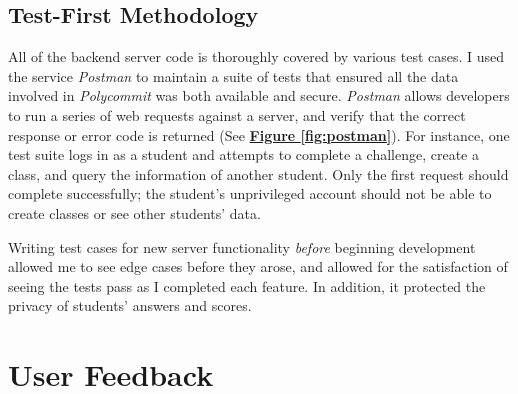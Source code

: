 \subsection{Test-First Methodology}
\par All of the backend server code is thoroughly covered by various test cases. I used the service \textit{Postman} to maintain a suite of tests that ensured all the data involved in \textit{Polycommit} was both available and secure. \textit{Postman} allows developers to run a series of web requests against a server, and verify that the correct response or error code is returned (See  \textbf{\hyperref[fig:polycommit5]{Figure \ref*{fig:postman}}}). For instance, one test suite logs in as a student and attempts to complete a challenge, create a class, and query the information of another student. Only the first request should complete successfully; the student's unprivileged account should not be able to create classes or see other students' data.

\par Writing test cases for new server functionality \textit{before} beginning development allowed me to see edge cases before they arose, and allowed for the satisfaction of seeing the tests pass as I completed each feature. In addition, it protected the privacy of students' answers and scores.



\section{User Feedback}

